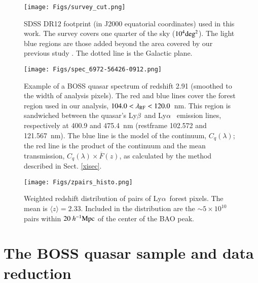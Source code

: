 \documentclass{aa}
\newcommand{\lamrf}{\lambda_{\rm RF}}
\newcommand{\hMpc}{h^{-1}{\rm Mpc}}
\newcommand{\lya}{Ly$\alpha$}
\newcommand{\Lya}{Ly$\alpha$~}
\newcommand{\Lyb}{Ly$\beta$~}
\begin{document}
\begin{figure*}[htbp]
\begin{center}
\texttt{[image: Figs/survey\_cut.png]}
\caption{SDSS DR12 footprint 
  (in J2000 equatorial coordinates) used in this work.
  The survey covers one quarter of the sky ($10^4{\rm deg^2}$).
  The light blue regions are those added beyond the area covered
  by our previous study \citep{2015A&A...574A..59D}.
  The dotted line is the Galactic plane.
}
\label{fig:skysectors}
\end{center}
\end{figure*}

\begin{figure}
\begin{center}
\texttt{[image: Figs/spec\_6972-56426-0912.png]}
\caption{
Example of a BOSS quasar spectrum of 
redshift 2.91 (smoothed to the width of analysis pixels).
The red and blue lines cover the
forest region used in our analysis, $104.0<\lamrf<120.0$~nm.
This region is sandwiched between the quasar's \Lyb and \Lya
emission lines, respectively at 
400.9 and 475.4~nm (restframe 102.572 and 
121.567~nm).
The blue line is
the model of the continuum, $C_q(\lambda)$;
the red line is the
product of the continuum and the
mean transmission, $C_q(\lambda)\times\overline{F}(z)$,
as calculated by the method described in Sect. \ref{xisec}. 
}
\label{spectrumfig}
\end{center}
\end{figure}


\begin{figure}
\texttt{[image: Figs/zpairs\_histo.png]}
\caption{Weighted redshift distribution of pairs
  of \lya~forest pixels. The mean is $\langle z\rangle=2.33$.
  Included in the distribution are the $\sim5\times10^{10}$ pairs
  within $20~\hMpc$ of the center of the BAO peak.
}
\label{zdistfig}
\end{figure}



\section{The BOSS quasar sample and data reduction}
\label{samplesec}
\end{document}

